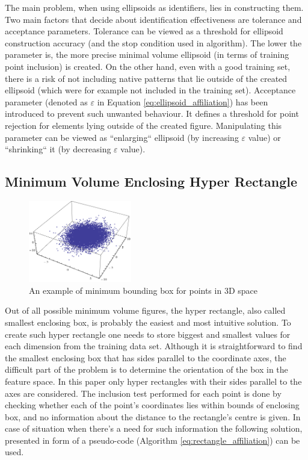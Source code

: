 The main problem, when using ellipsoids as identifiers, lies in constructing them. Two main factors that decide about identification effectiveness are tolerance and acceptance parameters. Tolerance can be viewed as a threshold for ellipsoid construction accuracy (and the stop condition used in algorithm). The lower the parameter is, the more precise minimal volume ellipsoid (in terms of training point inclusion) is created. On the other hand, even with a good training set, there is a risk of not including native patterns that lie outside of the created ellipsoid (which were for example not included in the training set). Acceptance parameter (denoted as $\varepsilon$ in Equation \ref{eq:ellipsoid_affiliation}) has been introduced to prevent such unwanted behaviour. It defines a threshold for point rejection for elements lying outside of the created figure. Manipulating this parameter can be viewed as ``enlarging`` ellipsoid (by increasing $\varepsilon$ value) or ``shrinking`` it (by decreasing $\varepsilon$ value).

\subsection{Minimum Volume Enclosing Hyper Rectangle}

\begin{figure}[htp]
	\centering
	\includegraphics[width=0.40\textwidth]{Figures/minimum_bounding_box.png}
	\caption{An example of minimum bounding box for points in 3D space}
	\label{fig:minimum_bounding_box_visualization}\vspace{-3pt}
\end{figure}

Out of all possible minimum volume figures, the hyper rectangle, also called smallest enclosing box, is probably the easiest and most intuitive solution. To create such hyper rectangle one needs to store biggest and smallest values for each dimension from the training data set. Although it is straightforward to find the smallest enclosing box that has sides parallel to the coordinate axes, the difficult part of the problem is to determine the orientation of the box in the feature space. In this paper only hyper rectangles with their sides parallel to the axes are considered. The inclusion test performed for each point is done by checking whether each of the point's coordinates lies within bounds of enclosing box, and no information about the distance to the rectangle's centre is given. In case of situation when there's a need for such information the following solution, presented in form of a pseudo-code (Algorithm \ref{eq:rectangle_affiliation}) can be used.

